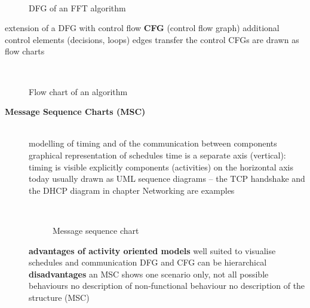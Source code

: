 \begin{figure}[!hbtp]
     \begin{center}
	  \\
	  \caption{DFG of an FFT algorithm}
     \end{center}
\end{figure}

\os{\newpage}

\bi
	\ite extension of a DFG with control flow \pr \textbf{CFG} (control flow graph)
	\ite additional control elements (decisions, loops)
	\ite edges transfer the control
	\ite CFGs are drawn as flow charts
\ei

\begin{figure}[!hbtp]
     \begin{center}
	  \\
	  \caption{Flow chart of an algorithm}
     \end{center}
\end{figure}
\os{\newpage}

\begin{description}
\item[{\rot\bf Message Sequence Charts (MSC)}]~\\[-\lblskip]
\bi
	\ite modelling of timing and of the communication between components
	\ite graphical representation of schedules
	\bi
		\ite time is a separate axis (vertical): timing is visible explicitly
		\ite components (activities) on the horizontal axis
	\ei
	\ite today usually drawn as UML sequence diagrams -- the TCP handshake and the DHCP diagram in chapter Networking are examples
\ei

\begin{figure}[!hbtp]
     \begin{center}
	  \\
	  \caption{Message sequence chart}
     \end{center}
\end{figure}

\os{\newpage}

\bi
	\ite \textbf{advantages of activity oriented models}
	\bi
		\ite well suited to visualise schedules and communication
		\ite DFG and CFG can be hierarchical
	\ei
	\ite \textbf{disadvantages}
	\bi
		\ite an MSC shows one scenario only, not all possible behaviours
		\ite no description of non-functional behaviour
		\ite no description of the structure (MSC)
	\ei
\ei
\end{description}
\os{\newpage}


